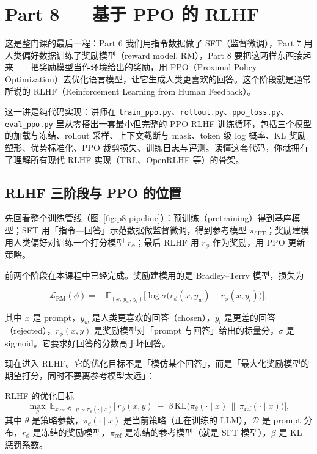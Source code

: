 \section{Part 8 — 基于 PPO 的 RLHF}

这是整门课的最后一程：Part 6 我们用指令数据做了 SFT（监督微调），Part 7 用人类偏好数据训练了奖励模型（reward model, RM），Part 8 要把这两样东西接起来——把奖励模型当作环境给出的奖励，用 PPO（Proximal Policy Optimization）去优化语言模型，让它生成人类更喜欢的回答。这个阶段就是通常所说的 RLHF（Reinforcement Learning from Human Feedback）。

这一讲是纯代码实现：讲师在 \texttt{train\_ppo.py}、\texttt{rollout.py}、\texttt{ppo\_loss.py}、\texttt{eval\_ppo.py} 里从零搭出一套最小但完整的 PPO-RLHF 训练循环，包括三个模型的加载与冻结、rollout 采样、上下文截断与 mask、token 级 log 概率、KL 奖励塑形、优势标准化、PPO 裁剪损失、训练日志与评测。读懂这套代码，你就拥有了理解所有现代 RLHF 实现（TRL、OpenRLHF 等）的骨架。

\subsection{RLHF 三阶段与 PPO 的位置}

先回看整个训练管线（图~\ref{fig:p8-pipeline}）：预训练（pretraining）得到基座模型；SFT 用「指令—回答」示范数据做监督微调，得到参考模型 $\pi_{\text{SFT}}$；奖励建模用人类偏好对训练一个打分模型 $r_\phi$；最后 RLHF 用 $r_\phi$ 作为奖励，用 PPO 更新策略。

前两个阶段在本课程中已经完成。奖励建模用的是 Bradley--Terry 模型，损失为

$$
\mathcal{L}_{\text{RM}}(\phi)
= -\,\mathbb{E}_{(x,\,y_w,\,y_l)}
\Big[\log \sigma\big(r_\phi(x, y_w) - r_\phi(x, y_l)\big)\Big],
$$

其中 $x$ 是 prompt，$y_w$ 是人类更喜欢的回答（chosen），$y_l$ 是更差的回答（rejected），$r_\phi(x,y)$ 是奖励模型对「prompt 与回答」给出的标量分，$\sigma$ 是 sigmoid。它要求好回答的分数高于坏回答。

现在进入 RLHF。它的优化目标不是「模仿某个回答」，而是「最大化奖励模型的期望打分，同时不要离参考模型太远」：

\begin{importantbox}{RLHF 的优化目标}
$$
\max_{\theta}\ \mathbb{E}_{x \sim \mathcal{D},\ y \sim \pi_\theta(\cdot \mid x)}
\Big[\, r_\phi(x, y) \;-\; \beta\, \mathrm{KL}\big(\pi_\theta(\cdot \mid x) \,\|\, \pi_{\text{ref}}(\cdot \mid x)\big) \Big],
$$
其中 $\theta$ 是策略参数，$\pi_\theta(\cdot\mid x)$ 是当前策略（正在训练的 LLM），$\mathcal{D}$ 是 prompt 分布，$r_\phi$ 是冻结的奖励模型，$\pi_{\text{ref}}$ 是冻结的参考模型（就是 SFT 模型），$\beta$ 是 KL 惩罚系数。
\end{importantbox}

